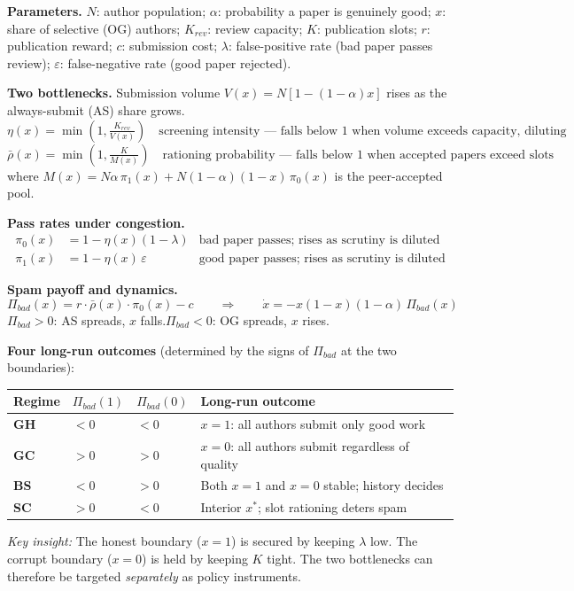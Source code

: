 \documentclass{article}
\begin{document}
\begin{tcolorbox}[boxstyle, title={Box S2\quad The Baseline Model in Brief}]
\small
\textbf{Parameters.}\;
$N$: author population;\;
$\alpha$: probability a paper is genuinely good;\;
$x$: share of selective (OG) authors;\;
$K_{rev}$: review capacity;\;
$K$: publication slots;\;
$r$: publication reward;\;
$c$: submission cost;\;
$\lambda$: false-positive rate (bad paper passes review);\;
$\varepsilon$: false-negative rate (good paper rejected).

\medskip
\textbf{Two bottlenecks.}\;
Submission volume $V(x)=N[1-(1-\alpha)x]$ rises as the always-submit (AS) share grows.
\[
  \eta(x)=\min\!\left(1,\tfrac{K_{rev}}{V(x)}\right)
  \quad\text{screening intensity --- falls below 1 when volume exceeds capacity, diluting scrutiny per paper}
\]
\[
  \bar{\rho}(x)=\min\!\left(1,\tfrac{K}{M(x)}\right)
  \quad\text{rationing probability --- falls below 1 when accepted papers exceed slots}
\]
where $M(x)=N\alpha\,\pi_1(x)+N(1-\alpha)(1-x)\,\pi_0(x)$ is the peer-accepted pool.

\medskip
\textbf{Pass rates under congestion.}
\begin{align*}
  \pi_0(x)&=1-\eta(x)(1-\lambda) &\text{bad paper passes; rises as scrutiny is diluted}\\
  \pi_1(x)&=1-\eta(x)\,\varepsilon &\text{good paper passes; rises as scrutiny is diluted}
\end{align*}

\textbf{Spam payoff and dynamics.}
\[
  \Pi_{bad}(x)=r\cdot\bar{\rho}(x)\cdot\pi_0(x)-c
  \qquad\Longrightarrow\qquad
  \dot{x}=-x(1-x)(1-\alpha)\,\Pi_{bad}(x)
\]
$\Pi_{bad}>0$: AS spreads, $x$ falls.\quad $\Pi_{bad}<0$: OG spreads, $x$ rises.

\medskip
\textbf{Four long-run outcomes} (determined by the signs of $\Pi_{bad}$ at the two boundaries):\smallskip

\noindent
\begin{tabular}{@{}llll@{}}
\toprule
Regime & $\Pi_{bad}(1)$ & $\Pi_{bad}(0)$ & Long-run outcome \\
\midrule
\textbf{GH} & $<0$ & $<0$ & $x=1$: all authors submit only good work \\
\textbf{GC} & $>0$ & $>0$ & $x=0$: all authors submit regardless of quality \\
\textbf{BS} & $<0$ & $>0$ & Both $x=1$ and $x=0$ stable; history decides \\
\textbf{SC} & $>0$ & $<0$ & Interior $x^*$; slot rationing deters spam \\
\bottomrule
\end{tabular}

\smallskip
\textit{Key insight:} The honest boundary ($x=1$) is secured by keeping $\lambda$ low.
The corrupt boundary ($x=0$) is held by keeping $K$ tight.
The two bottlenecks can therefore be targeted \emph{separately} as policy instruments.
\end{tcolorbox}
\end{document}
